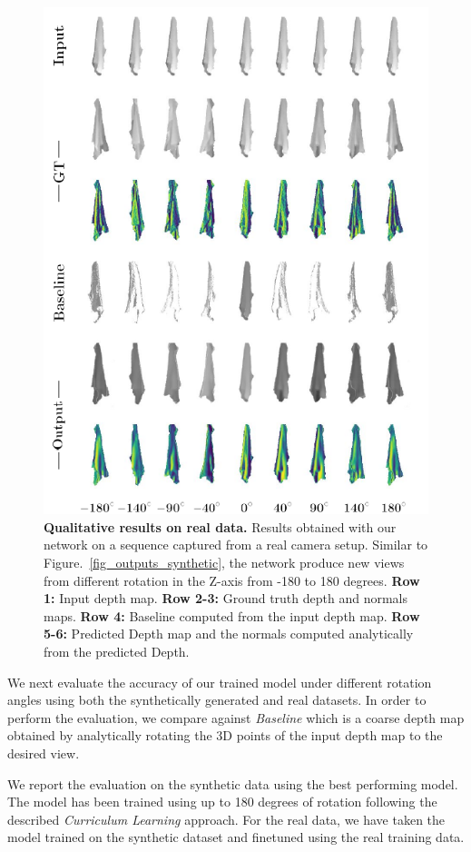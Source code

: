 \begin{figure}
\begin{center}
    \includegraphics[width=0.5\linewidth]{main/chapter04/data/ipalm_cvpr_grid_real_vertical.pdf}
    \caption{\small{{\bf Qualitative results on real data.} Results obtained with our network on a sequence captured from a real camera setup. Similar to Figure.~\ref{fig_outputs_synthetic}, the network produce new views from different rotation in the Z-axis from -180 to 180 degrees. \textbf{Row 1:} Input depth map. \textbf{Row 2-3:} Ground truth depth and normals maps. \textbf{Row 4:} Baseline computed from the input depth map. \textbf{Row 5-6:} Predicted Depth map and the normals computed analytically from the predicted Depth.}}
    \label{fig_outputs_real}
\end{center}
\end{figure}

We next evaluate the accuracy of our trained model under different rotation angles using both the  synthetically generated and real datasets. In order to perform the evaluation, we compare against {\em Baseline} which is  a coarse depth map obtained by analytically rotating the 3D points of the input depth map to the desired view.

We report the evaluation on the synthetic data using the best performing model. The model has been trained using up to  180 degrees of rotation following the described \textit{Curriculum Learning} approach. For the real data, we have taken the model trained on the synthetic dataset and finetuned using the real training data.

\newcommand{\bgt}{\bD_{\textrm{GT}}}
\newcommand{\bdcoarse}{\bD_{\textrm{coarse}}}

